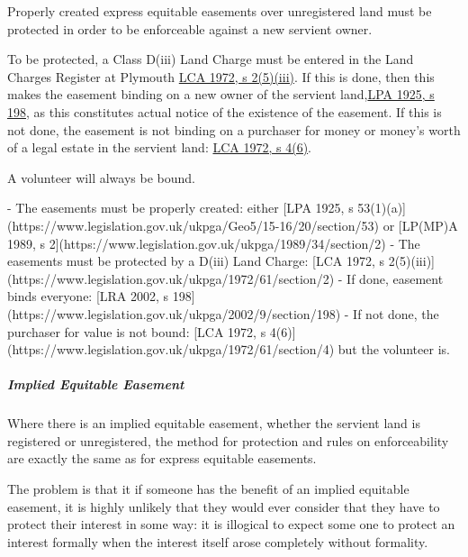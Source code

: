 \documentclass[
]{article}
\newenvironment{Shaded}{}{}
\newcommand{\NormalTok}[1]{#1}
\begin{document}
Properly created express equitable easements over unregistered land must
be protected in order to be enforceable against a new servient owner.

To be protected, a Class D(iii) Land Charge must be entered in the Land
Charges Register at Plymouth
\href{https://www.legislation.gov.uk/ukpga/1972/61/section/2}{LCA 1972,
s 2(5)(iii)}. If this is done, then this makes the easement binding on a
new owner of the servient
land,\href{https://www.legislation.gov.uk/ukpga/Geo5/15-16/20/section/198}{LPA
1925, s 198}, as this constitutes actual notice of the existence of the
easement. If this is not done, the easement is not binding on a
purchaser for money or money's worth of a legal estate in the servient
land: \href{https://www.legislation.gov.uk/ukpga/1972/61/section/4}{LCA
1972, s 4(6)}.

A volunteer will always be bound.

\begin{Shaded}
\begin{Highlighting}[]
\NormalTok{{-} The easements must be properly created: either [LPA 1925, s 53(1)(a)](https://www.legislation.gov.uk/ukpga/Geo5/15{-}16/20/section/53) or [LP(MP)A 1989, s 2](https://www.legislation.gov.uk/ukpga/1989/34/section/2)}
\NormalTok{{-} The easements must be protected by a D(iii) Land Charge: [LCA 1972, s 2(5)(iii)](https://www.legislation.gov.uk/ukpga/1972/61/section/2)}
\NormalTok{{-} If done, easement binds everyone: [LRA 2002, s 198](https://www.legislation.gov.uk/ukpga/2002/9/section/198)}
\NormalTok{{-} If not done, the purchaser for value is not bound: [LCA 1972, s 4(6)](https://www.legislation.gov.uk/ukpga/1972/61/section/4) but the volunteer is.}
\end{Highlighting}
\end{Shaded}

\hypertarget{implied-equitable-easement}{%
\subparagraph{Implied Equitable
Easement}\label{implied-equitable-easement}}

Where there is an implied equitable easement, whether the servient land
is registered or unregistered, the method for protection and rules on
enforceability are exactly the same as for express equitable easements.

The problem is that it if someone has the benefit of an implied
equitable easement, it is highly unlikely that they would ever consider
that they have to protect their interest in some way: it is illogical to
expect some one to protect an interest formally when the interest itself
arose completely without formality.
\end{document}
